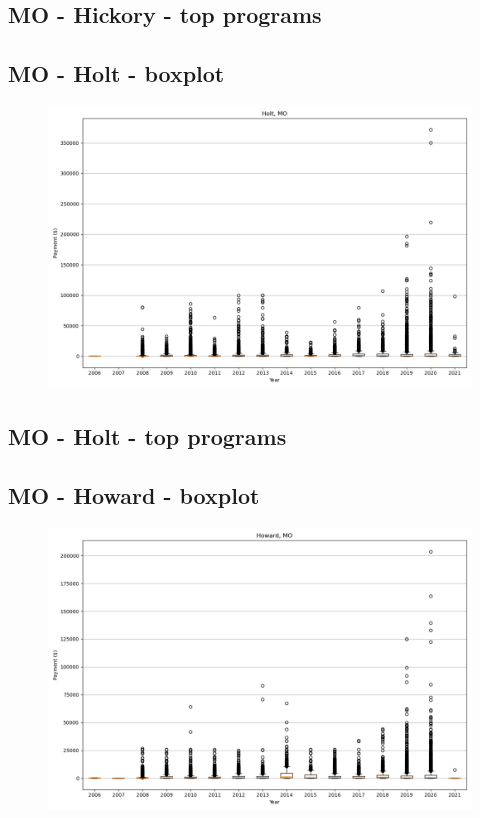 \subsection*{MO - Hickory - top programs}

\newpage
\subsection*{MO - Holt - boxplot}
\begin{figure}[h]
\centering
\includegraphics[width=7in]{../output/boxplots/counties/Holt-MO_boxplot.png}
\end{figure}


\subsection*{MO - Holt - top programs}

\newpage
\subsection*{MO - Howard - boxplot}
\begin{figure}[h]
\centering
\includegraphics[width=7in]{../output/boxplots/counties/Howard-MO_boxplot.png}
\end{figure}


